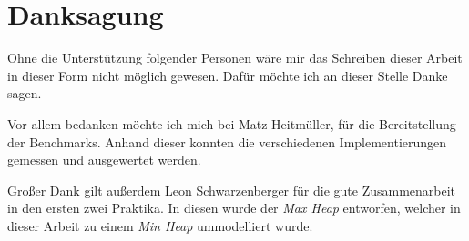 \section{Danksagung}

Ohne die Unterstützung folgender Personen wäre mir das Schreiben dieser Arbeit in dieser Form nicht möglich gewesen. Dafür möchte ich an dieser Stelle Danke sagen.

Vor allem bedanken möchte ich mich bei Matz Heitmüller, für die Bereitstellung der Benchmarks. Anhand dieser konnten die verschiedenen Implementierungen gemessen und ausgewertet werden.

Großer Dank gilt außerdem Leon Schwarzenberger für die gute Zusammenarbeit in den ersten zwei Praktika. In diesen wurde der \textit{Max Heap} entworfen, welcher in dieser Arbeit zu einem \textit{Min Heap} ummodelliert wurde.